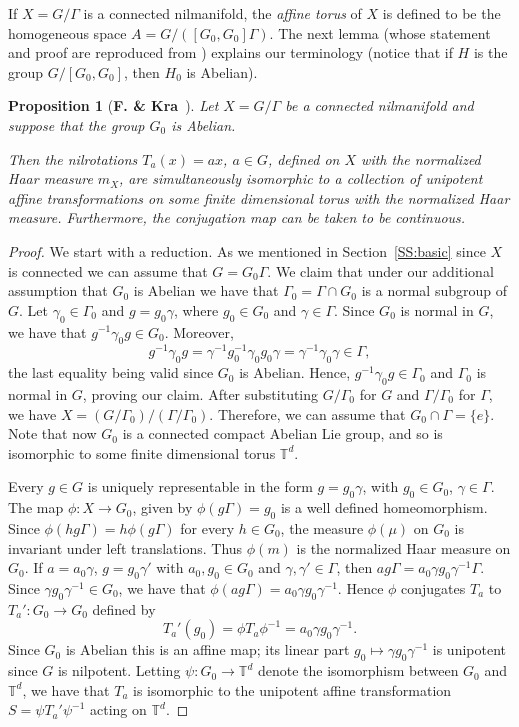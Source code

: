 \documentclass[11pt]{amsart}
\newcommand{\T}{\mathbb{T}}
\theoremstyle{plain}
\newtheorem{proposition}[theorem]{Proposition}
\theoremstyle{definition}
\theoremstyle{remark}
\begin{document}
If $X=G/\Gamma$ is a connected nilmanifold, the {\em affine torus} of
$X$ is defined to be the homogeneous space $A=G/([G_0,G_0]\Gamma)$.
The next lemma (whose statement and proof are reproduced from
\cite{FK}) explains our terminology (notice that if $H$ is the group
$G/[G_0,G_0]$, then $H_0$ is Abelian).
\begin{proposition}[{\bf F. \& Kra}~\cite{FK}]\label{P:FK}
  Let $X=G/\Gamma$ be a connected nilmanifold and suppose that the group $G_0$ is
  Abelian.

  Then the nilrotations $T_a(x)=ax$, $a\in G$, defined on $X$
  with the normalized Haar measure $m_X$, are simultaneously
  isomorphic to a collection of unipotent affine transformations on
  some finite dimensional torus with the normalized Haar measure. Furthermore,
  the conjugation map can be taken to be continuous.
\end{proposition}
\begin{proof}
  We start with a reduction. As we mentioned in Section~\ref{SS:basic}
  since $X$ is connected we can assume that $G=G_0\Gamma$.  We claim
  that under our additional assumption that $G_0$ is Abelian we have
  that $\Gamma_0=\Gamma\cap G_0$ is a normal subgroup of $G$. Let
  $\gamma_0\in \Gamma_0$ and $g=g_0\gamma$, where $g_0\in G_0$ and
  $\gamma\in \Gamma$. Since $G_0$ is normal in $G$, we have that
  $g^{-1}\gamma_0 g\in G_0$. Moreover,
$$
g^{-1} \gamma_0 g=\gamma^{-1} g_0^{-1} \gamma_0 g_0 \gamma=
\gamma^{-1} \gamma_0 \gamma \in\Gamma,
$$
the last equality being valid since $G_0$ is Abelian. Hence,
$g^{-1}\gamma_0 g\in\Gamma_0$ and $\Gamma_0$ is normal in $G$, proving our claim.
After substituting $G/\Gamma_0$ for $G$ and
$\Gamma/\Gamma_0$ for $\Gamma$, we have
$X=(G/\Gamma_0)/(\Gamma/\Gamma_0)$. Therefore, we can assume that $G_0\cap
\Gamma=\{e\}$. Note that now $G_0$ is a connected compact Abelian Lie
group, and so is isomorphic to some finite dimensional torus $\T^d$.

Every $g\in G$ is uniquely representable in the form $g=g_0\gamma$,
with $g_0\in G_0$, $\gamma \in \Gamma$. The map $\phi\colon X\to G_0$,
given by $\phi(g\Gamma)=g_0$ is a well defined homeomorphism. Since
$\phi(hg\Gamma)=h\phi(g\Gamma)$ for every $h\in G_0$, the measure
$\phi(\mu)$ on $G_0$ is invariant under left translations.  Thus
$\phi(m)$ is the normalized Haar measure on $G_0$. If $a=a_0\gamma$,
$g=g_0\gamma'$ with $a_0,g_0\in G_0$ and $\gamma,\gamma'\in\Gamma$,
then $ag\Gamma=a_0\gamma g_0 \gamma^{-1}\Gamma$.  Since $\gamma g_0
\gamma^{-1} \in G_0$, we have that $\phi(ag\Gamma)=a_0\gamma
g_0\gamma^{-1}$. Hence $\phi$ conjugates $T_a$ to $T_a'\colon G_0\to
G_0$ defined by
$$
T_a'(g_0)=\phi T_a \phi^{-1}=a_0\gamma g_0 \gamma^{-1}.
$$
Since $G_0$ is Abelian this is an affine map; its linear part
$g_0\mapsto \gamma g_0 \gamma^{-1}$ is unipotent since $G$ is
nilpotent.  Letting $\psi\colon G_0\to \T^d$ denote the isomorphism
between $G_0$ and $\T^d$, we have that $T_a$ is isomorphic to the
unipotent affine transformation $S=\psi T_a'\psi^{-1}$ acting on
$\T^d$.
\end{proof}
\end{document}
